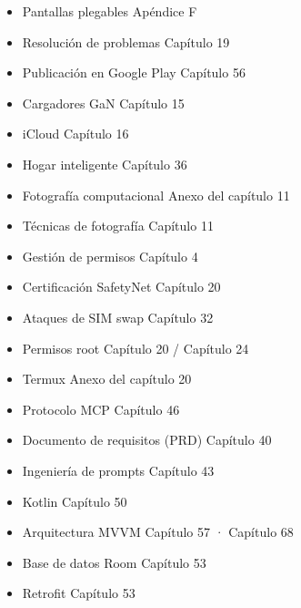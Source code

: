 
\begin{itemize}
  \item Pantallas plegables Apéndice F
  \item Resolución de problemas Capítulo 19
  \item Publicación en Google Play Capítulo 56
  \item Cargadores GaN Capítulo 15
  \item iCloud Capítulo 16
  \item Hogar inteligente Capítulo 36
  \item Fotografía computacional Anexo del capítulo 11
\end{itemize}


\begin{itemize}
  \item Técnicas de fotografía Capítulo 11
  \item Gestión de permisos Capítulo 4
  \item Certificación SafetyNet Capítulo 20
  \item Ataques de SIM swap Capítulo 32
  \item Permisos root Capítulo 20 / Capítulo 24
  \item Termux Anexo del capítulo 20
  \item Protocolo MCP Capítulo 46
  \item Documento de requisitos (PRD) Capítulo 40
  \item Ingeniería de prompts Capítulo 43
  \item Kotlin Capítulo 50
  \item Arquitectura MVVM Capítulo 57 · Capítulo 68
  \item Base de datos Room Capítulo 53
  \item Retrofit Capítulo 53
\end{itemize}


